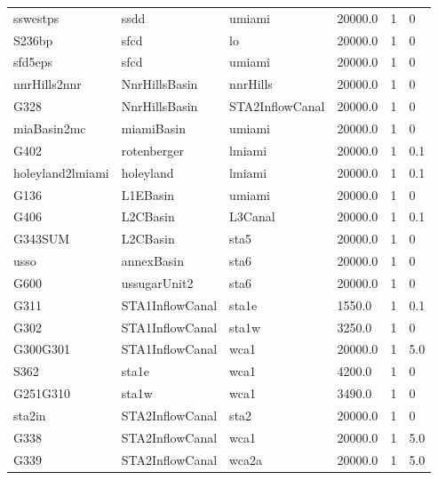 \begin{table}[!htb]
\begin{center}
\begin{tabular}{p{2.8cm}p{2.5cm}p{2.5cm}p{1.8cm}p{1.5cm}p{1.5cm}}
  sswestps         &ssdd            &umiami           &20000.0        &1       &0   \\
  S236bp           &sfcd            &lo               &20000.0        &1       &0   \\
  sfd5eps          &sfcd            &umiami           &20000.0        &1       &0   \\
  nnrHills2nnr     &NnrHillsBasin   &nnrHills         &20000.0        &1       &0   \\
  G328             &NnrHillsBasin   &STA2InflowCanal  &20000.0        &1       &0   \\
  miaBasin2mc      &miamiBasin      &umiami           &20000.0        &1       &0   \\
  G402             &rotenberger     &lmiami           &20000.0        &1       &0.1 \\
  holeyland2lmiami &holeyland       &lmiami           &20000.0        &1       &0.1 \\
  G136             &L1EBasin        &umiami           &20000.0        &1       &0   \\
  G406             &L2CBasin        &L3Canal          &20000.0        &1       &0.1 \\
  G343SUM          &L2CBasin        &sta5             &20000.0        &1       &0   \\
  usso             &annexBasin      &sta6             &20000.0        &1       &0   \\
  G600             &ussugarUnit2    &sta6             &20000.0        &1       &0   \\
  G311             &STA1InflowCanal &sta1e            & 1550.0        &1       &0.1 \\
  G302             &STA1InflowCanal &sta1w            & 3250.0        &1       &0   \\
  G300G301         &STA1InflowCanal &wca1             &20000.0        &1       &5.0 \\ 
  S362             &sta1e           &wca1             & 4200.0        &1       &0   \\
  G251G310         &sta1w           &wca1             & 3490.0        &1       &0   \\
  sta2in           &STA2InflowCanal &sta2             &20000.0        &1       &0   \\
  G338             &STA2InflowCanal &wca1             &20000.0        &1       &5.0 \\
  G339             &STA2InflowCanal &wca2a            &20000.0        &1       &5.0 \\

\end{tabular}
\end{center}
\end{table}
